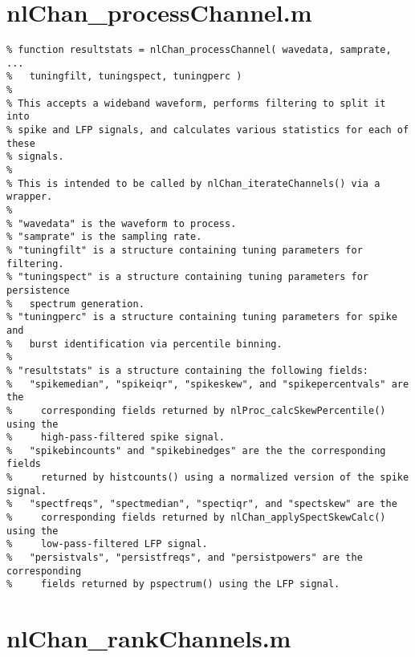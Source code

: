 \section{nlChan\_processChannel.m}

\begin{verbatim}
% function resultstats = nlChan_processChannel( wavedata, samprate, ...
%   tuningfilt, tuningspect, tuningperc )
%
% This accepts a wideband waveform, performs filtering to split it into
% spike and LFP signals, and calculates various statistics for each of these
% signals.
%
% This is intended to be called by nlChan_iterateChannels() via a wrapper.
%
% "wavedata" is the waveform to process.
% "samprate" is the sampling rate.
% "tuningfilt" is a structure containing tuning parameters for filtering.
% "tuningspect" is a structure containing tuning parameters for persistence
%   spectrum generation.
% "tuningperc" is a structure containing tuning parameters for spike and
%   burst identification via percentile binning.
%
% "resultstats" is a structure containing the following fields:
%   "spikemedian", "spikeiqr", "spikeskew", and "spikepercentvals" are the
%     corresponding fields returned by nlProc_calcSkewPercentile() using the
%     high-pass-filtered spike signal.
%   "spikebincounts" and "spikebinedges" are the the corresponding fields
%     returned by histcounts() using a normalized version of the spike signal.
%   "spectfreqs", "spectmedian", "spectiqr", and "spectskew" are the
%     corresponding fields returned by nlChan_applySpectSkewCalc() using the
%     low-pass-filtered LFP signal.
%   "persistvals", "persistfreqs", and "persistpowers" are the corresponding
%     fields returned by pspectrum() using the LFP signal.
\end{verbatim}

\section{nlChan\_rankChannels.m}

